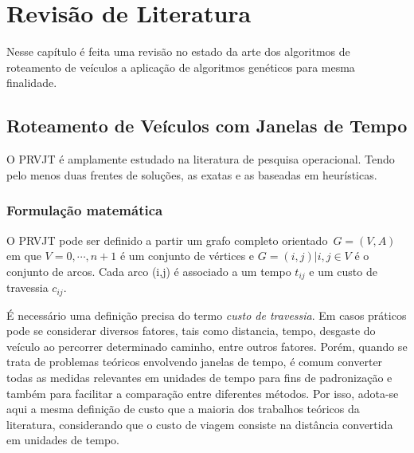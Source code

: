 \chapter[Revisão de Literatura]{Revisão de Literatura}


Nesse capítulo é feita uma revisão no estado da arte dos algoritmos de roteamento de veículos a aplicação de algoritmos genéticos para mesma finalidade.

\section{Roteamento de Veículos com Janelas de Tempo}

O PRVJT é amplamente estudado na literatura de pesquisa operacional. Tendo pelo menos duas frentes de soluções, as exatas e as baseadas em heurísticas. 


\subsection{Formulação matemática}

O PRVJT pode ser definido a partir um grafo completo orientado~\(G = (V,A)\) em que \(V = {0,\cdots,n+1}\) é um conjunto de vértices e \(G ={(i,j)|i,j \in V}\) é o conjunto de arcos.
Cada arco (i,j) é associado a um tempo \(t_{ij}\) e um custo de travessia \(c_{ij}\).

É necessário uma definição precisa do termo \textit{custo de travessia}. Em casos práticos pode se considerar diversos fatores, tais como distancia, tempo, desgaste do veículo ao percorrer determinado caminho, entre outros fatores. Porém, quando se trata de problemas teóricos envolvendo janelas de tempo, é comum converter todas as medidas relevantes em unidades de tempo para fins de padronização e também para facilitar a comparação entre diferentes métodos. Por isso, adota-se aqui a mesma definição de custo que a maioria dos trabalhos teóricos da literatura, considerando que o custo de viagem consiste na distância convertida em unidades de tempo. \cite{ROCHAT}

